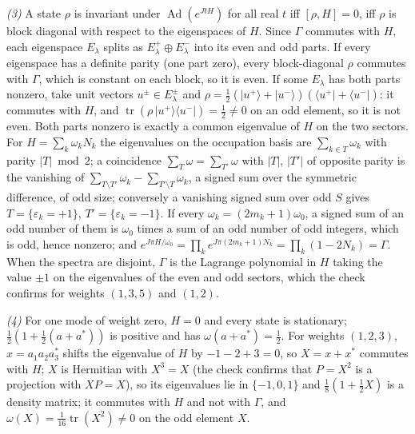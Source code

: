 \emph{(3)} A state $\rho$ is invariant under $\operatorname{Ad}(e^{JtH})$ for all real $t$ iff $[\rho, H] = 0$, iff $\rho$ is block diagonal with respect to the eigenspaces of $H$. Since $\Gamma$ commutes with $H$, each eigenspace $E_\lambda$ splits as $E_\lambda^+ \oplus E_\lambda^-$ into its even and odd parts. If every eigenspace has a definite parity (one part zero), every block-diagonal $\rho$ commutes with $\Gamma$, which is constant on each block, so it is even. If some $E_\lambda$ has both parts nonzero, take unit vectors $u^\pm \in E_\lambda^\pm$ and $\rho = \tfrac12(\lvert u^+\rangle + \lvert u^-\rangle)(\langle u^+\rvert + \langle u^-\rvert)$: it commutes with $H$, and $\operatorname{tr}(\rho\,\lvert u^+\rangle\langle u^-\rvert) = \tfrac12 \neq 0$ on an odd element, so it is not even. Both parts nonzero is exactly a common eigenvalue of $H$ on the two sectors. For $H = \sum_k\omega_kN_k$ the eigenvalues on the occupation basis are $\sum_{k\in T}\omega_k$ with parity $|T| \bmod 2$; a coincidence $\sum_{T}\omega = \sum_{T'}\omega$ with $|T|$, $|T'|$ of opposite parity is the vanishing of $\sum_{T\setminus T'}\omega_k - \sum_{T'\setminus T}\omega_k$, a signed sum over the symmetric difference, of odd size; conversely a vanishing signed sum over odd $S$ gives $T = \{\varepsilon_k = +1\}$, $T' = \{\varepsilon_k = -1\}$. If every $\omega_k = (2m_k+1)\omega_0$, a signed sum of an odd number of them is $\omega_0$ times a sum of an odd number of odd integers, which is odd, hence nonzero; and $e^{J\pi H/\omega_0} = \prod_k e^{J\pi(2m_k+1)N_k} = \prod_k(1-2N_k) = \Gamma$. When the spectra are disjoint, $\Gamma$ is the Lagrange polynomial in $H$ taking the value $\pm 1$ on the eigenvalues of the even and odd sectors, which the check confirms for weights $(1,3,5)$ and $(1,2)$.

\emph{(4)} For one mode of weight zero, $H = 0$ and every state is stationary; $\tfrac12(1 + \tfrac12(a + a^*))$ is positive and has $\omega(a + a^*) = \tfrac12$. For weights $(1,2,3)$, $x = a_1a_2a_3^*$ shifts the eigenvalue of $H$ by $-1-2+3 = 0$, so $X = x + x^*$ commutes with $H$; $X$ is Hermitian with $X^3 = X$ (the check confirms that $P = X^2$ is a projection with $XP = X$), so its eigenvalues lie in $\{-1,0,1\}$ and $\tfrac18(1 + \tfrac12 X)$ is a density matrix; it commutes with $H$ and not with $\Gamma$, and $\omega(X) = \tfrac{1}{16}\operatorname{tr}(X^2) \neq 0$ on the odd element $X$.

